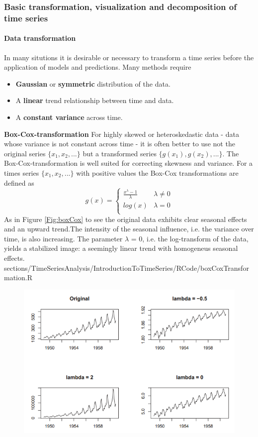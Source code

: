 {{\begin{figure}[H]
\begin{minipage}[t]{.5\textwidth}
		\label{Fig:APVsElectricity}
	\end{minipage}
\end{figure}

}
\subsubsection{Basic transformation, visualization and decomposition of time series}
{\paragraph{Data transformation}
	In many situtions it is desirable or necessary to transform a time series before the application of models and predictions. Many methods require
	\begin{itemize}
		\item \textbf{Gaussian} or \textbf{symmetric} distribution of the data.
		\item A \textbf{linear} trend relationship between time and data.
		\item A \textbf{constant variance} across time.
	\end{itemize}
\RTheory
{\textbf{Box-Cox-transformation}\vfill
For highly skewed or heteroskedastic data - data whose variance is not constant across time - it is often better to use not the original series $\{x_1, x_2, ...\}$ but a transformed series $\{g(x_1), g(x_2),...\}$. The Box-Cox-transformation is well suited for correcting skewness and variance.
\vfill
\hfill
\break
For a times series $\{x_1, x_2, . . . \}$ with positive values the Box-Cox transformations
are defined as
$$ g(x)=\begin{cases}
\frac{x^{\lambda}-1}{\lambda} &\lambda \neq 0\\
log(x) &\lambda = 0\\
\end{cases}$$
As in Figure \ref{Fig:boxCox} to see the original data exhibits clear seasonal effects and an upward trend.The intensity of
the seasonal influence, i.e. the variance over time, is also increasing. The parameter $\lambda$ = 0, i.e. the log-transform of the data, yields a stabilized image: a
seemingly linear trend with homogeneus seasonal effects.
}
{sections/TimeSeriesAnalysis/IntroductionToTimeSeries/RCode/boxCoxTransformation.R}
\begin{figure}[H]\centering
	\includegraphics[width=0.7\linewidth]{images/boxCox.png}

\end{figure}}}
